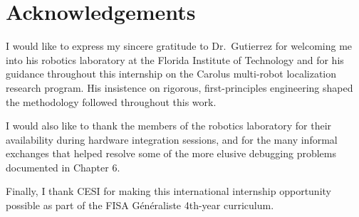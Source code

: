 \chapter*{Acknowledgements}

I would like to express my sincere gratitude to Dr.\ Gutierrez for welcoming me into his robotics laboratory at the Florida Institute of Technology and for his guidance throughout this internship on the Carolus multi-robot localization research program. His insistence on rigorous, first-principles engineering shaped the methodology followed throughout this work.

I would also like to thank the members of the robotics laboratory for their availability during hardware integration sessions, and for the many informal exchanges that helped resolve some of the more elusive debugging problems documented in Chapter 6.

Finally, I thank CESI for making this international internship opportunity possible as part of the FISA Généraliste 4th-year curriculum.
